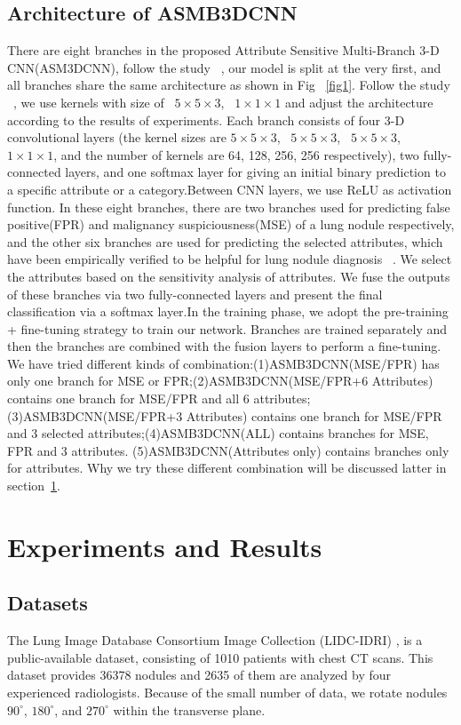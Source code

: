 \documentclass[runningheads]{llncs}
\begin{document}
\subsection{Architecture of ASMB3DCNN}
\label{architecture}
There are eight branches in the proposed Attribute Sensitive Multi-Branch 3-D CNN(ASM3DCNN), follow the study ~\cite{nanwu2019dnn}, our model is split at the very first, and all branches share the same architecture as shown in Fig ~\ref{fig1}.
Follow the study ~\cite{Qi2016Multilevel}, we use kernels with size of  ~$5\times5\times3$, ~$1\times1\times1$ and adjust the architecture according to the results of experiments. Each branch consists of four 3-D convolutional layers (the kernel sizes are $5\times5\times3$, ~$5\times5\times3$, ~$5\times5\times3$, ~$1\times1\times1$, and the number of kernels are 64, 128, 256, 256 respectively), two fully-connected layers, and one softmax layer for giving an initial binary prediction to a specific attribute or a category.Between CNN layers, we use ReLU as activation function. In these eight branches, there are two branches used for predicting false positive(FPR) and malignancy suspiciousness(MSE) of a lung nodule respectively, and the other six branches are used for predicting the selected attributes, which have been empirically verified to be helpful for lung nodule diagnosis~ \cite{Hussein2017Risk}. 
We select the attributes based on the sensitivity analysis of attributes.  We fuse the outputs of these branches via two fully-connected layers and present the final classification via a softmax layer.In the training phase, we adopt the pre-training + fine-tuning strategy to train our network. Branches are trained separately and then the branches are combined with the fusion layers to perform a fine-tuning. We have tried different kinds of combination:(1)ASMB3DCNN(MSE/FPR)  has only one branch for MSE or FPR;(2)ASMB3DCNN(MSE/FPR+6 Attributes) contains one branch for MSE/FPR and all 6 attributes;(3)ASMB3DCNN(MSE/FPR+3 Attributes)  contains one branch for MSE/FPR and 3 selected attributes;(4)ASMB3DCNN(ALL) contains branches for MSE, FPR and 3  attributes. (5)ASMB3DCNN(Attributes only) contains branches only for attributes. Why we try these different combination will be discussed latter in section~\ref{exp}.

\section{Experiments and Results}
\label{exp}
\subsection{Datasets}
The Lung Image Database Consortium Image Collection (LIDC-IDRI) \cite{Armato2010WE}, is a public-available dataset, consisting of 1010 patients with chest CT scans. This dataset provides 36378 nodules and 2635 of them are analyzed by four experienced radiologists. Because of the small number of data, we rotate nodules $90^{\circ}$, $180^{\circ}$, and $270^{\circ}$ within the transverse plane.
\end{document}
